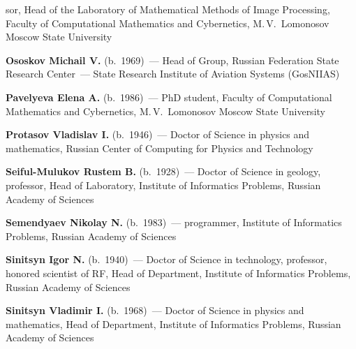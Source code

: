 \begin{multicols}{2}
\noindent
sor,
Head of the Laboratory of Mathematical Methods of Image Processing, 
Faculty of Computational Mathematics and Cybernetics, M.\,V.~Lomonosov Moscow State University




\noindent
\textbf{Ososkov Michail V.} (b.\ 1969)~--- Head of Group,
Russian Federation State Research Center~--- State Research
Institute of Aviation Systems (GosNIIAS)


\noindent
\textbf{Pavelyeva Elena A.} (b.\ 1986)~--- PhD student, 
Faculty of Computational Mathematics and Cybernetics, M.\,V.~Lomonosov Moscow State University


\noindent
\textbf{Protasov Vladislav I.} (b.\ 1946)~--- Doctor of Science in physics and mathematics,
Russian Center of Computing for Physics and Technology


\noindent
\textbf{Seiful-Mulukov Rustem B.} (b.\ 1928)~--- Doctor of Science in geology, professor, 
Head of Laboratory, Institute of Informatics Problems, Russian Academy of Sciences  


\noindent
\textbf{Semendyaev Nikolay N.} (b.\ 1983)~--- programmer, Institute of Informatics Problems, 
Russian Academy of Sciences


\noindent 
\textbf{Sinitsyn Igor N.} (b.\ 1940)~--- Doctor of Science in technology,
professor, honored scientist  of RF,
Head of Department, Institute of Informatics Problems,  Russian Academy of Sciences


\noindent
\textbf{Sinitsyn Vladimir I.} (b.\ 1968)~--- Doctor of Science in physics and mathematics, 
Head of Department, Institute of Informatics Problems, Russian Academy of Sciences


\end{multicols}
